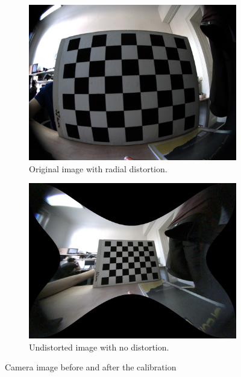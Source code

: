 \begin{figure}[h]
    \begin{subfigure}[b]{0.45\textwidth}
      \includegraphics[width=\textwidth]{graphics/chessboard_img.png}
      \caption{Original image with radial distortion.}
      \label{fig:chb1}
    \end{subfigure}
    \hfill
    \begin{subfigure}[b]{0.45\textwidth}
      \includegraphics[width=\textwidth]{graphics/chessboard_img_rect.png}
      \caption{Undistorted image with no distortion.}
      \label{fig:chb2}
    \end{subfigure}
    \caption{Camera image before and after the calibration}
    \label{fig:chb}
\end{figure}

